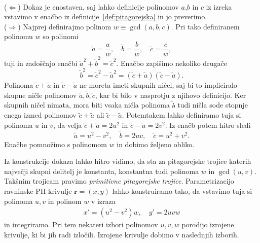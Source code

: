 \documentclass[isrm2, tisk]{fmfdelo}
\begin{document}
    \begin{dokaz}
        \mbox{}\\
        ($\Leftarrow$) Dokaz je enostaven, saj lahko definicije polinomov $a$,$b$ in $c$ iz izreka vstavimo v enačbo iz definicije~\ref{def:pitagorejska} in jo preverimo. \\
        ($\Rightarrow$) Najprej definirajmo polinom $w\equiv \gcd(a,b,c)$.
        Pri tako definiranem polinomu $w$ so polinomi \[\tilde{a}=\frac{a}{w},\quad \tilde{b}=\frac{b}{w},\quad \tilde{c}=\frac{c}{w},\] tuji in zadoščajo enačbi $\tilde{a}^2+\tilde{b}^2=\tilde{c}^2$.
        Enačbo zapišimo nekoliko drugače \[\tilde{b}^2= \tilde{c}^2-\tilde{a}^2 = (\tilde{c}+\tilde{a})(\tilde{c}-\tilde{a}).\]
        Polinoma $\tilde{c}+\tilde{a}$ in $\tilde{c}-\tilde{a}$ ne moreta imeti skupnih ničel, saj bi to impliciralo skupne ničle polinomov $\tilde{a},\tilde{b},\tilde{c}$, kar bi bilo v nasprotju z njihovo definicijo.
        Ker skupnih ničel nimata, mora biti vsaka ničla polinoma $\tilde{b}$ tudi ničla sode stopnje enega izmed polinomov $\tilde{c}+\tilde{a}$ ali $\tilde{c}-\tilde{a}$.
        Potemtakem lahko definiramo tuja si polinoma $u$ in $v$, da velja $\tilde{c}+\tilde{a}=2u^2$ in $\tilde{c}-\tilde{a}=2v^2$.
        Iz enačb potem hitro sledi \[\tilde{a}=u^2-v^2,\quad\tilde{b}=2uv, \quad\tilde{c}=u^2+v^2.\]
        Enačbe pomnožimo s polinomom $w$ in dobimo željeno obliko. \qedhere
    \end{dokaz}
    \noindent Iz konstrukcije dokaza lahko hitro vidimo, da sta za pitagorejske trojice katerih največji skupni delitelj je konstanta, konstantna tudi polinoma $w$ in $\gcd(u,v)$.
    Takšnim trojicam pravimo \textit{primitivne pitagorejske trojice}.
    Parametrizacijo ravninske PH krivulje $\mathbf{r}=(x,y)$ lahko konstruiramo tako, da vstavimo tuja si polinoma $u,v$ in polinom $w$ v izraza
    \begin{align}
        x'=(u^2-v^2)w,\quad y'=2uvw  \label{eq:hodograf-splosni}
    \end{align} in integriramo.
    Pri tem nekateri izbori polinomov $u,v,w$ porodijo izrojene krivulje, ki bi jih radi izločili.
    Izrojene krivulje dobimo v naslednjih izborih.
\end{document}
